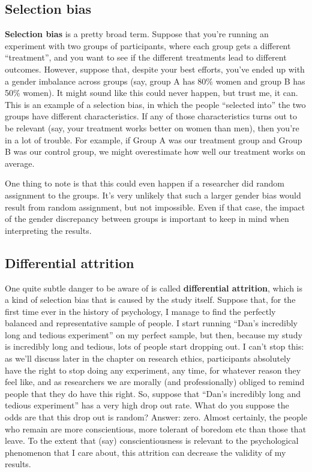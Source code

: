 \documentclass[
]{book}
\begin{document}
\subsection{Selection bias}\label{selection-bias}

\textbf{Selection bias} is a pretty broad term. Suppose that you're running an experiment with two groups of participants, where each group gets a different ``treatment'', and you want to see if the different treatments lead to different outcomes. However, suppose that, despite your best efforts, you've ended up with a gender imbalance across groups (say, group A has 80\% women and group B has 50\% women). It might sound like this could never happen, but trust me, it can. This is an example of a selection bias, in which the people ``selected into'' the two groups have different characteristics. If any of those characteristics turns out to be relevant (say, your treatment works better on women than men), then you're in a lot of trouble. For example, if Group A was our treatment group and Group B was our control group, we might overestimate how well our treatment works on average.

One thing to note is that this could even happen if a researcher did random assignment to the groups. It's very unlikely that such a larger gender bias would result from random assignment, but not impossible. Even if that case, the impact of the gender discrepancy between groups is important to keep in mind when interpreting the results.

\subsection{Differential attrition}\label{differential-attrition}

One quite subtle danger to be aware of is called \textbf{differential attrition}, which is a kind of selection bias that is caused by the study itself. Suppose that, for the first time ever in the history of psychology, I manage to find the perfectly balanced and representative sample of people. I start running ``Dan's incredibly long and tedious experiment'' on my perfect sample, but then, because my study is incredibly long and tedious, lots of people start dropping out. I can't stop this: as we'll discuss later in the chapter on research ethics, participants absolutely have the right to stop doing any experiment, any time, for whatever reason they feel like, and as researchers we are morally (and professionally) obliged to remind people that they do have this right. So, suppose that ``Dan's incredibly long and tedious experiment'' has a very high drop out rate. What do you suppose the odds are that this drop out is random? Answer: zero. Almost certainly, the people who remain are more conscientious, more tolerant of boredom etc than those that leave. To the extent that (say) conscientiousness is relevant to the psychological phenomenon that I care about, this attrition can decrease the validity of my results.
\end{document}
